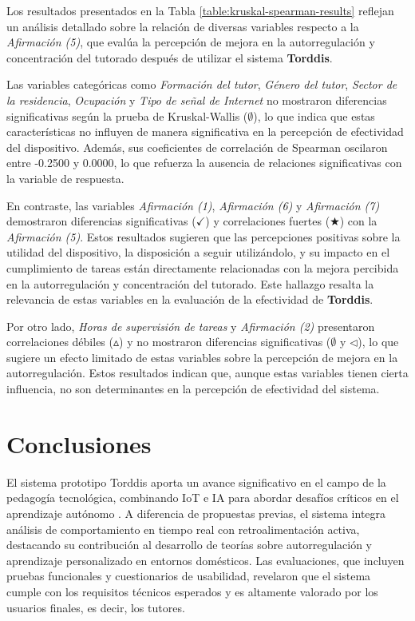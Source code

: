 \documentclass[a4paper,fleqn]{cas-sc}
\begin{document}
					Los resultados presentados en la Tabla \ref{table:kruskal-spearman-results} reflejan un análisis detallado sobre la relación de diversas variables respecto a la \textit{Afirmación (5)}, que evalúa la percepción de mejora en la autorregulación y concentración del tutorado después de utilizar el sistema \textbf{Torddis}.
					
					Las variables categóricas como \textit{Formación del tutor}, \textit{Género del tutor}, \textit{Sector de la residencia}, \textit{Ocupación} y \textit{Tipo de señal de Internet} no mostraron diferencias significativas según la prueba de Kruskal-Wallis (\(\emptyset\)), lo que indica que estas características no influyen de manera significativa en la percepción de efectividad del dispositivo. Además, sus coeficientes de correlación de Spearman oscilaron entre -0.2500 y 0.0000, lo que refuerza la ausencia de relaciones significativas con la variable de respuesta.
					
					En contraste, las variables \textit{Afirmación (1)}, \textit{Afirmación (6)} y \textit{Afirmación (7)} demostraron diferencias significativas (\(\checkmark\)) y correlaciones fuertes (\(\bigstar\)) con la \textit{Afirmación (5)}. Estos resultados sugieren que las percepciones positivas sobre la utilidad del dispositivo, la disposición a seguir utilizándolo, y su impacto en el cumplimiento de tareas están directamente relacionadas con la mejora percibida en la autorregulación y concentración del tutorado. Este hallazgo resalta la relevancia de estas variables en la evaluación de la efectividad de \textbf{Torddis}.
					
					Por otro lado, \textit{Horas de supervisión de tareas} y \textit{Afirmación (2)} presentaron correlaciones débiles (\(\vartriangle\)) y no mostraron diferencias significativas (\(\emptyset\) y \(\triangleleft\)), lo que sugiere un efecto limitado de estas variables sobre la percepción de mejora en la autorregulación. Estos resultados indican que, aunque estas variables tienen cierta influencia, no son determinantes en la percepción de efectividad del sistema.
											
	\section{Conclusiones}
	\label{seccion:Seis}
		El sistema prototipo Torddis aporta un avance significativo en el campo de la pedagogía tecnológica, combinando IoT e IA para abordar desafíos críticos en el aprendizaje autónomo \citep{DiPietro2025Meta}. A diferencia de propuestas previas, el sistema integra análisis de comportamiento en tiempo real con retroalimentación activa, destacando su contribución al desarrollo de teorías sobre autorregulación y aprendizaje personalizado en entornos domésticos. Las evaluaciones, que incluyen pruebas funcionales y cuestionarios de usabilidad, revelaron que el sistema cumple con los requisitos técnicos esperados y es altamente valorado por los usuarios finales, es decir, los tutores.
		
\end{document}
